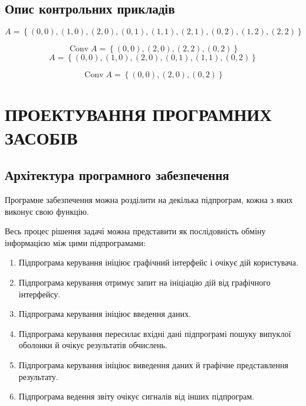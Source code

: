 \documentclass[simple,14pt,utf8,ukrainian]{eskdtext}
\begin{document}
  \subsection{Опис контрольних прикладів}
  \label{ssec:ex}
    \[
      A = \left\{
        (0, 0), (1, 0), (2, 0),
        (0, 1), (1, 1), (2, 1),
        (0, 2), (1, 2), (2, 2)
      \right\}
    \]

    \[ \mathop{Conv} A = \left\{
        (0, 0), (2, 0), (2, 2), (0, 2)
       \right\}
    \]
    \[
      A = \left\{
        (0, 0), (1, 0), (2, 0),
        (0, 1), (1, 1),
        (0, 2)
      \right\}
    \]

    \[
      \mathop{Conv} A = \left\{
        (0, 0), (2, 0), (0, 2)
      \right\}
    \]
\newpage
\section{ПРОЕКТУВАННЯ ПРОГРАМНИХ ЗАСОБІВ}
\subsection{Архітектура програмного забезпечення}

    Програмне забезпечення можна розділити на декілька підпрограм, кожна з
    яких виконує свою функцію.

    Весь процес рішення задачі можна представити як послідовність обміну
    інформацією між цими підпрограмами:
    \begin{enumerate}
      \item Підпрограма керування ініціює графічний інтерфейс і очікує дій
        користувача.
      \item Підпрограма керування отримує запит на ініціацію дій від
        графічного інтерфейсу.
      \item Підпрограма керування ініціює введення даних.
      \item Підпрограма керування пересилає вхідні дані підпрограмі пошуку
        випуклої оболонки й очікує результатів обчислень.
      \item Підпрограма керування ініціює виведення даних й графічне
        представлення результату.
      \item Підпрограма ведення звіту очікує сигналів від інших підпрограм.
    \end{enumerate}
\end{document}
